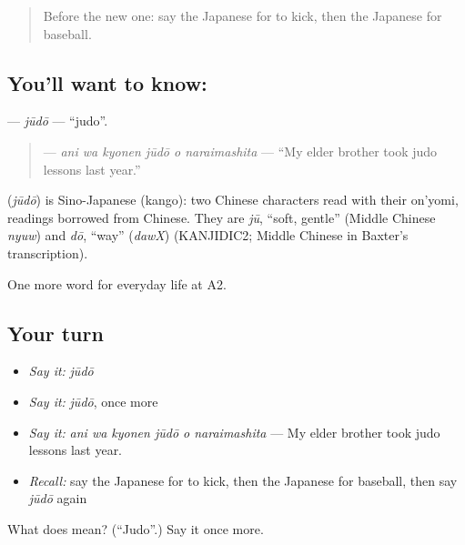 \begin{quote}
Before the new one: say the Japanese for to kick, then the Japanese for baseball.
\end{quote}

\subsection*{You'll want to know: }
\textbf{} — \emph{jūdō} — \textquotedblleft{}judo\textquotedblright{}.

\begin{quote}
\textbf{   } — \emph{ani wa kyonen jūdō o naraimashita} — \textquotedblleft{}My elder brother took judo lessons last year.\textquotedblright{}
\end{quote}

\begin{cousinweb}
\textbf{} (\emph{jūdō}) is Sino-Japanese (kango): two Chinese characters read with their on'yomi, readings borrowed from Chinese. They are \emph{jū}, \textquotedblleft{}soft, gentle\textquotedblright{} (Middle Chinese \emph{nyuw}) and \emph{dō}, \textquotedblleft{}way\textquotedblright{} (\emph{dawX}) (KANJIDIC2; Middle Chinese in Baxter's transcription).
\end{cousinweb}

\begin{grammarlens}[title={What you've built}]
One more word for everyday life at A2.
\end{grammarlens}

\subsection*{Your turn}
\begin{itemize}
\raggedright
  \item \emph{Say it:} \emph{jūdō}
  \item \emph{Say it:} \emph{jūdō}, once more
  \item \emph{Say it:} \emph{ani wa kyonen jūdō o naraimashita} — My elder brother took judo lessons last year.
  \item \emph{Recall:} say the Japanese for to kick, then the Japanese for baseball, then say \emph{jūdō} again
\end{itemize}

\begin{tcolorbox}[breakable,colback=teal!4,colframe=teal!35!black,title={Before you move on}]
What does  mean? (\textquotedblleft{}Judo\textquotedblright{}.) Say it once more.
\end{tcolorbox}
